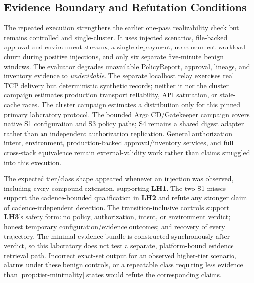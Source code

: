 \subsection{Evidence Boundary and Refutation Conditions}
The repeated execution strengthens the earlier one-pass realizability check
but remains controlled and single-cluster. It uses injected scenarios,
file-backed approval and environment streams, a single deployment, no
concurrent workload churn during positive injections, and only six separate
five-minute benign windows. The evaluator degrades unavailable PolicyReport, approval, lineage, and
inventory evidence to \emph{undecidable}. The separate localhost relay
exercises real TCP delivery but deterministic synthetic records; neither it
nor the cluster campaign estimates production transport reliability, API
saturation, or stale-cache races. The cluster campaign estimates a
distribution only for this
pinned primary laboratory protocol. The bounded Argo CD/Gatekeeper campaign
covers native S1 configuration and S3 policy paths; S4 remains a shared digest
adapter rather than an independent authorization replication. General authorization,
intent, environment, production-backed approval/inventory services, and full
cross-stack equivalence remain external-validity work rather than claims
smuggled into this execution.

The expected tier/class shape appeared whenever an injection was observed,
including every compound extension, supporting \textbf{LH1}. The two S1 misses support
the cadence-bounded qualification in \textbf{LH2} and refute any stronger
claim of cadence-independent detection. The transition-inclusive controls
support \textbf{LH3}'s safety form: no policy, authorization, intent, or
environment verdict; honest temporary configuration/evidence outcomes; and
recovery of every trajectory.
The minimal evidence bundle is
constructed synchronously after verdict, so this laboratory does not test a
separate, platform-bound evidence retrieval path.
Incorrect exact-set output for an observed higher-tier scenario, alarms under these
benign controls, or a repeatable class requiring less evidence than
\cref{prop:tier-minimality} states would refute the corresponding claims.
